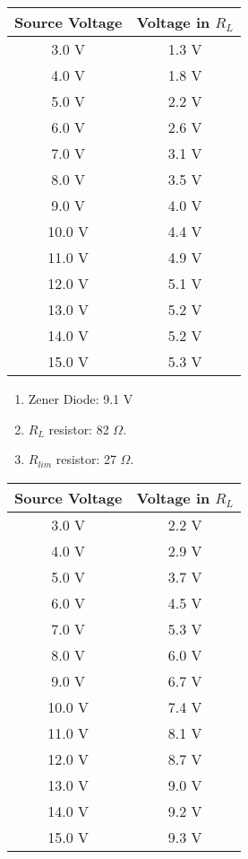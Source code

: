 \begin{multicols}{3}
\begin{tasks}
\begin{center}
\begin{tabular}[.5cm]{ c c }
\toprule
Source Voltage & Voltage in $R_{L}$ \\
\midrule
3.0 V & 1.3 V \\
\cmidrule{1-2}
4.0 V & 1.8 V \\
\cmidrule{1-2}
5.0 V & 2.2 V \\
\cmidrule{1-2}
6.0 V & 2.6 V \\
\cmidrule{1-2}
7.0 V & 3.1 V \\
\cmidrule{1-2}
8.0 V & 3.5 V \\
\cmidrule{1-2}
9.0 V & 4.0 V \\
\cmidrule{1-2}
10.0 V & 4.4 V \\
\cmidrule{1-2}
11.0 V & 4.9 V \\
\cmidrule{1-2}
12.0 V & 5.1 V \\
\cmidrule{1-2}
13.0 V & 5.2 V \\
\cmidrule{1-2}
14.0 V & 5.2 V \\
\cmidrule{1-2}
15.0 V & 5.3 V \\
\bottomrule
\end{tabular}
\end{center}

\begin{enumerate}
\item Zener Diode: 9.1 V
\item $R_{L}$ resistor: 82 $\Omega$.
\item $R_{lim}$ resistor: 27 $\Omega$.
\end{enumerate}

\begin{center}
\begin{tabular}[.5cm]{ c c }
\toprule
Source Voltage & Voltage in $R_{L}$ \\
\midrule
3.0 V & 2.2 V \\
\cmidrule{1-2}
4.0 V & 2.9 V \\
\cmidrule{1-2}
5.0 V & 3.7 V \\
\cmidrule{1-2}
6.0 V & 4.5 V \\
\cmidrule{1-2}
7.0 V & 5.3 V \\
\cmidrule{1-2}
8.0 V & 6.0 V \\
\cmidrule{1-2}
9.0 V & 6.7 V \\
\cmidrule{1-2}
10.0 V & 7.4 V \\
\cmidrule{1-2}
11.0 V & 8.1 V \\
\cmidrule{1-2}
12.0 V & 8.7 V \\
\cmidrule{1-2}
13.0 V & 9.0 V \\
\cmidrule{1-2}
14.0 V & 9.2 V \\
\cmidrule{1-2}
15.0 V & 9.3 V \\
\bottomrule
\end{tabular}
\end{center}
\end{tasks}
\end{multicols}


\pagebreak